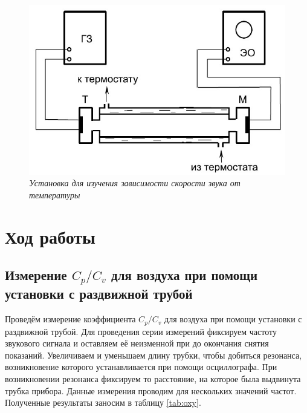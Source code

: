 \documentclass[a4paper,12pt]{article}
\theoremstyle{definition}
\begin{document}
	\begin{figure}[H]
		\begin{center}
			\includegraphics[width=12cm]{ust2.jpg}
		\end{center}
		\caption{\textit{Установка для изучения зависимости скорости звука от температуры}}
		\label{img2}
	\end{figure}
	
	\section{Ход работы}
	
	\subsection{Измерение $ C_p/C_v $ для воздуха при помощи установки с раздвижной трубой}
	
	\label{ident}
	
	Проведём измерение коэффициента $ C_p/C_v $ для воздуха при помощи установки с раздвижной трубой. Для проведения серии измерений фиксируем частоту звукового сигнала и оставляем её неизменной при до окончания снятия показаний. Увеличиваем и уменьшаем длину трубки, чтобы добиться резонанса, возникновение которого устанавливается при помощи осциллографа. При возникновении резонанса фиксируем то расстояние, на которое была выдвинута трубка прибора. Данные измерения проводим для нескольких значений частот. Полученные результаты заносим в таблицу \ref{tab:oxy}.
	
\end{document}
